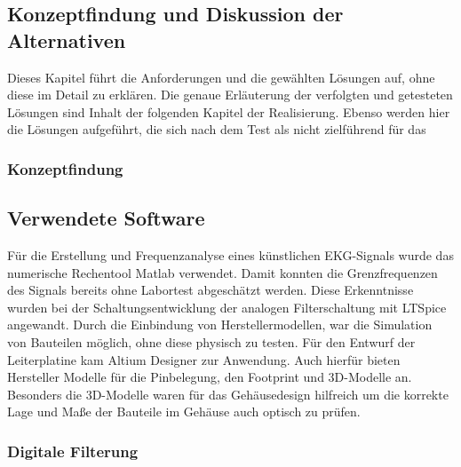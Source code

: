 
\subsection{Konzeptfindung und Diskussion der Alternativen}

Dieses Kapitel führt die Anforderungen und die gewählten Lösungen auf, ohne diese im Detail zu erklären. Die genaue Erläuterung der verfolgten und getesteten Lösungen sind Inhalt der folgenden Kapitel der Realisierung. Ebenso werden hier die Lösungen aufgeführt, die sich nach dem Test als nicht zielführend für das

\subsubsection{Konzeptfindung}

\subsection{Verwendete Software}

Für die Erstellung und Frequenzanalyse eines künstlichen EKG-Signals wurde das numerische Rechentool Matlab verwendet. Damit konnten die Grenzfrequenzen des Signals bereits ohne Labortest abgeschätzt werden. Diese Erkenntnisse wurden bei der Schaltungsentwicklung der analogen Filterschaltung mit LTSpice angewandt. Durch die Einbindung von Herstellermodellen, war die Simulation von Bauteilen möglich, ohne diese physisch zu testen. Für den Entwurf der Leiterplatine kam Altium Designer zur Anwendung. Auch hierfür bieten Hersteller Modelle für die Pinbelegung, den Footprint und 3D-Modelle an. Besonders die 3D-Modelle waren für das Gehäusedesign hilfreich um die korrekte Lage und Maße der Bauteile im Gehäuse auch optisch zu prüfen.

\subsubsection{Digitale Filterung}

